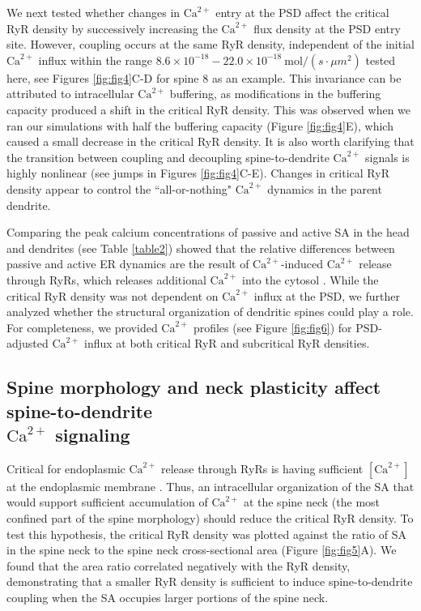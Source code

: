 \documentclass[12pt]{article}
\begin{document}
We next tested whether changes in $\textrm{Ca}^{2+}$ entry at the PSD affect the critical RyR density by successively increasing the $\textrm{Ca}^{2+}$ flux density at the PSD entry site. However, coupling occurs at the same RyR density, independent of the initial $\textrm{Ca}^{2+}$ influx within the range $8.6\times 10^{-18}-22.0\times 10^{-18}\ \textrm{mol}/(s\cdot \mu m^2)$ tested here, see Figures \ref{fig:fig4}C-D for spine 8 as an example. This invariance can be attributed to intracellular $\textrm{Ca}^{2+}$ buffering, as modifications in the buffering capacity produced a shift in the critical RyR density. This was observed when we ran our simulations with half the buffering capacity (Figure \ref{fig:fig4}E), which caused a small decrease in the critical RyR density. It is also worth clarifying that the transition between coupling and decoupling spine-to-dendrite $\textrm{Ca}^{2+}$ signals is highly nonlinear (see jumps in Figures \ref{fig:fig4}C-E). Changes in critical RyR density appear to control the ``all-or-nothing" $\textrm{Ca}^{2+}$ dynamics in the parent dendrite. 

Comparing the peak calcium concentrations of passive and active SA in the head and dendrites (see Table \ref{table2}) showed that the relative differences between passive and active ER dynamics are the result of $\textrm{Ca}^{2+}$-induced $\textrm{Ca}^{2+}$ release through RyRs, which releases additional $\textrm{Ca}^{2+}$ into the cytosol \cite{Johenning2015}. While the critical RyR density was not dependent on $\textrm{Ca}^{2+}$ influx at the PSD, we further analyzed whether the structural organization of dendritic spines could play a role. For completeness, we provided $\textrm{Ca}^{2+}$ profiles (see Figure \ref{fig:fig6}) for PSD-adjusted $\textrm{Ca}^{2+}$ influx at both critical RyR and subcritical RyR densities.


\subsection*{Spine morphology and neck plasticity affect spine-to-dendrite \\ $\textrm{Ca}^{2+}$ signaling}
Critical for endoplasmic $\textrm{Ca}^{2+}$ release through RyRs is having sufficient $[\textrm{Ca}^{2+}]$ at the endoplasmic membrane \cite{Emptage1999,Korkotian1999,Korkotian2014}. Thus, an intracellular organization of the SA that would support sufficient accumulation of $\textrm{Ca}^{2+}$ at the spine neck (the most confined part of the spine morphology) should reduce the critical RyR density. To test this hypothesis, the critical RyR density was plotted against the ratio of SA in the spine neck to the spine neck cross-sectional area (Figure \ref{fig:fig5}A). We found that the area ratio correlated negatively with the RyR density, demonstrating that a smaller RyR density is sufficient to induce spine-to-dendrite coupling when the SA occupies larger portions of the spine neck.
		
\end{document}
